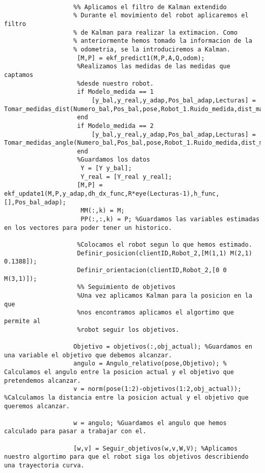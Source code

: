 \begin{lstlisting}[frame=single]
                    
                   %% Aplicamos el filtro de Kalman extendido
                   % Durante el movimiento del robot aplicaremos el filtro
                   % de Kalman para realizar la extimacion. Como
                   % anteriormente hemos tomado la informacion de la
                   % odometria, se la introduciremos a Kalman.
                    [M,P] = ekf_predict1(M,P,A,Q,odom);
                    %Realizamos las medidas de las medidas que captamos
                    %desde nuestro robot.
                    if Modelo_medida == 1
                        [y_bal,y_real,y_adap,Pos_bal_adap,Lecturas] = Tomar_medidas_dist(Numero_bal,Pos_bal,pose,Robot_1.Ruido_medida,dist_max);
                    end
                    if Modelo_medida == 2
                        [y_bal,y_real,y_adap,Pos_bal_adap,Lecturas] = Tomar_medidas_angle(Numero_bal,Pos_bal,pose,Robot_1.Ruido_medida,dist_max);   
                    end
                    %Guardamos los datos
                     Y = [Y y_bal];
                     Y_real = [Y_real y_real];
                    [M,P] = ekf_update1(M,P,y_adap,dh_dx_func,R*eye(Lecturas-1),h_func,[],Pos_bal_adap);
                     MM(:,k) = M; 
                     PP(:,:,k) = P; %Guardamos las variables estimadas en los vectores para poder tener un historico.
                       
                    %Colocamos el robot segun lo que hemos estimado.
                    Definir_posicion(clientID,Robot_2,[M(1,1) M(2,1) 0.1388]);
                    Definir_orientacion(clientID,Robot_2,[0 0 M(3,1)]);
                    %% Seguimiento de objetivos
                    %Una vez aplicamos Kalman para la posicion en la que
                    %nos encontramos aplicamos el algortimo que permite al
                    %robot seguir los objetivos.
                   
                   Objetivo = objetivos(:,obj_actual); %Guardamos en una variable el objetivo que debemos alcanzar.
                   angulo = Angulo_relativo(pose,Objetivo); % Calculamos el angulo entre la posicion actual y el objetivo que pretendemos alcanzar.
                   v = norm(pose(1:2)-objetivos(1:2,obj_actual)); %Calculamos la distancia entre la posicion actual y el objetivo que queremos alcanzar.

                   w = angulo; %Guardamos el angulo que hemos calculado para pasar a trabajar con el.
                   
                   [w,v] = Seguir_objetivos(w,v,W,V); %Aplicamos nuestro algortimo para que el robot siga los objetivos describiendo una trayectoria curva.


\end{lstlisting}
